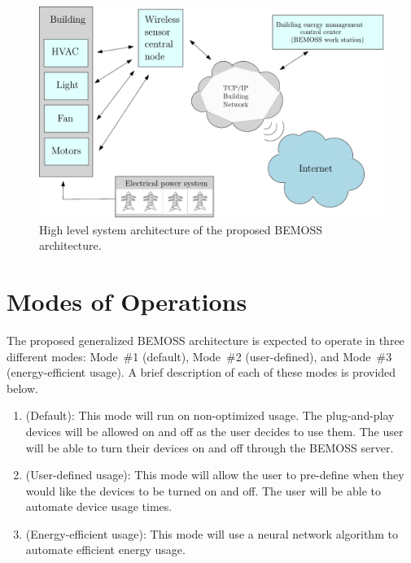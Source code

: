 \documentclass[12pt]{article} %
\begin{document}
\begin{figure}
    \centering
    \begin{mdframed}[backgroundcolor=yellow!20,roundcorner=7pt,outerlinecolor= blue!70!black,outerlinewidth=1.2]
    \includegraphics[scale=0.9]{figs/ipe/highLevelBemoss}
    \end{mdframed}
    \caption{High level system architecture of the proposed BEMOSS architecture.}
    \label{fig:highLevelBemoss}
\end{figure}



\section{Modes of Operations}
\label{sec:modesOfOperations}

The proposed generalized BEMOSS architecture is expected to operate in three different modes: Mode~\#1 (default), Mode~\#2 (user-defined), and Mode~\#3 (energy-efficient usage). A brief description of each of these modes is provided below. %
%
\begin{enumerate}
    \item (Default): This mode will run on non-optimized usage. The plug-and-play devices will be allowed on and off as the user decides to use them. The user will be able to turn their devices on and off through the BEMOSS server.
    \item (User-defined usage): This mode will allow the user to pre-define when they would like the devices to be turned on and off. The user will be able to automate device usage times. 
    \item (Energy-efficient usage): This mode will use a neural network algorithm to automate efficient energy usage.
\end{enumerate}
\end{document}
